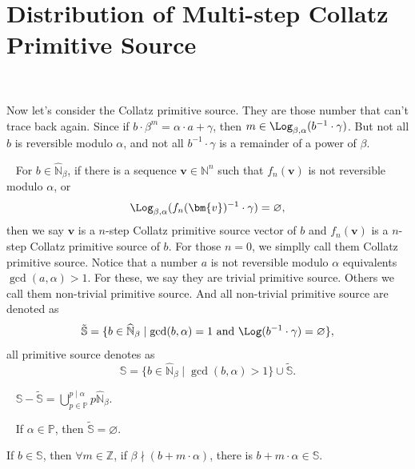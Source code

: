 \section{Distribution of Multi-step Collatz Primitive Source}~\label{sec:distribution-of-multi-step-collatz-primitive-source}

Now let's consider the Collatz primitive source. They are those number that can't trace back again.
Since if $b \cdot \beta^m = \alpha\cdot a + \gamma$, then $m \in \Log_{\beta,\alpha}(b^{-1}\cdot\gamma)$.
But not all $b$ is reversible modulo $\alpha$, and not all $b^{-1} \cdot \gamma$ is a remainder of a power of $\beta$.

\begin{definition}~\label{collatz-primitive-source}
    For $b\in \widehat{\mathbb{N}}_{\beta}$, if there is a sequence $\bm{v}\in \mathbb{N}^{n}$ such that $f_{n}(\bm{v})$ is not reversible modulo $\alpha$, or
    \[\Log_{\beta, \alpha}(f_{n}(\bm{v})^{-1} \cdot \gamma) = \varnothing, \]
    then we say $\bm{v}$ is a $n$-step Collatz primitive source vector of $b$ and $f_{n}(\bm{v})$ is a $n$-step Collatz primitive source of $b$.
    For those $n = 0$, we simplly call them Collatz primitive source.
    Notice that a number $a$ is not reversible modulo $\alpha$ equivalents $\gcd(a, \alpha) > 1$. For these, we say they are trivial primitive source.
    Others we call them non-trivial primitive source.\newline
    And all non-trivial primitive source are denoted as 
    \[\tilde{\mathbb{S}} = \{b \in \widehat{\mathbb{N}}_{\beta} \mid \gcd(b, \alpha) = 1 \text{ and } \Log(b^{-1}\cdot\gamma) = \varnothing\}, \]
    all primitive source denotes as
    \[ \mathbb{S} = \{b \in \widehat{\mathbb{N}}_{\beta} \mid \gcd(b, \alpha) > 1\}\cup \tilde{\mathbb{S}}. \]
\end{definition}
\begin{proposition}~\label{prop:trivial-primitive-source}
    $\mathbb{S} - \tilde{\mathbb{S}} = \bigcup_{p\in\mathbb{P}}^{p\mid\alpha} p\widehat{\mathbb{N}}_{{\beta}}$.
\end{proposition}
\begin{proposition}~\label{prop:primitive-source-of-prime-alpha}
    If $\alpha \in \mathbb{P}$, then $\tilde{\mathbb{S}} = \varnothing$.
\end{proposition}
\begin{proposition}
    If $b \in \mathbb{S}$, then $\forall m \in \mathbb{Z}$, if $\beta \nmid (b + m\cdot\alpha)$, there is $b + m\cdot\alpha \in \mathbb{S}$.
\end{proposition}


